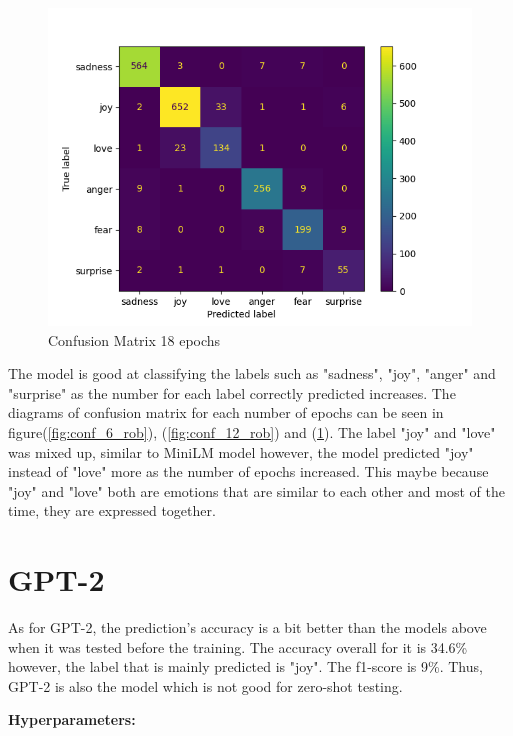 \begin{figure}[h!]
\begin{minipage}{.5\textwidth}
        \centering
        \includegraphics[width=1\linewidth]{Figures/conf_metrix_roberta_18_epochs.png}
        \caption{Confusion Matrix 18 epochs}
        \label{fig:conf_18_rob}
    \end{minipage}%
\end{figure}

The model is good at classifying the labels such as "sadness", "joy", "anger" and "surprise" as the number for each label correctly predicted increases. The diagrams of confusion matrix for each number of epochs can be seen in figure(\ref{fig:conf_6_rob}), (\ref{fig:conf_12_rob}) and (\ref{fig:conf_18_rob}). The label "joy" and "love" was mixed up, similar to MiniLM model however, the model predicted "joy" instead of "love" more as the number of epochs increased. This maybe because "joy" and "love" both are emotions that are similar to each other and most of the time, they are expressed together.

\section{GPT-2}
As for GPT-2, the prediction's accuracy is a bit better than the models above when it was tested before the training. The accuracy overall for it is 34.6\% however, the label that is mainly predicted is "joy". The f1-score is 9\%. Thus, GPT-2 is also the model which is not good for zero-shot testing.
\bigskip
\bigskip
\bigskip
\bigskip
\bigskip
\bigskip
\bigskip

\textbf{Hyperparameters:}

